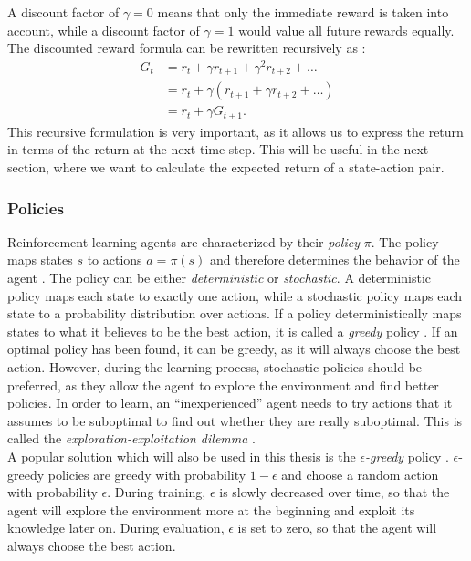 A discount factor of $\gamma=0$ means that only the immediate reward is taken into account, while a discount factor of $\gamma=1$ would value all future rewards equally.
\\
The discounted reward formula can be rewritten recursively as \cite[55]{sutton_reinforcement_nodate}:
\begin{align}
    G_t &= r_t + \gamma r_{t+1} + \gamma^2 r_{t+2} + \dots \nonumber \\
    &= r_t + \gamma (r_{t+1} + \gamma r_{t+2} + \dots) \nonumber \\
    &= r_t + \gamma G_{t+1} \text{.}
    \label{eq:discounted-return-recursive}
\end{align}
This recursive formulation is very important, as it allows us to express the return in terms of the return at the next time step.
This will be useful in the next section, where we want to calculate the expected return of a state-action pair.\\


\subsubsection{Policies}
\label{subsubsec:policies}
Reinforcement learning agents are characterized by their \textit{policy} $\pi$.
The policy maps states $s$ to actions $a=\pi(s)$ and therefore determines the behavior of the agent \cite[ch. 3.5]{sutton_reinforcement_nodate}.
The policy can be either \textit{deterministic} or \textit{stochastic}.
A deterministic policy maps each state to exactly one action, while a stochastic policy maps each state to a probability distribution over actions.
If a policy deterministically maps states to what it believes to be the best action, it is called a \textit{greedy} policy \cite[64]{sutton_reinforcement_nodate}.
If an optimal policy has been found, it can be greedy, as it will always choose the best action.
However, during the learning process, stochastic policies should be preferred, as they allow the agent to explore the environment and find better policies.
In order to learn, an \enquote{inexperienced} agent needs to try actions that it assumes to be suboptimal to find out whether they are really suboptimal.
This is called the \textit{exploration-exploitation dilemma} \cite[3]{sutton_reinforcement_nodate}.\\
A popular solution which will also be used in this thesis is the \textit{$\epsilon$-greedy} policy \cite[100]{sutton_reinforcement_nodate}.
$\epsilon$-greedy policies are greedy with probability $1-\epsilon$ and choose a random action with probability $\epsilon$.
During training, $\epsilon$ is slowly decreased over time, so that the agent will explore the environment more at the beginning and exploit its knowledge later on.
During evaluation, $\epsilon$ is set to zero, so that the agent will always choose the best action.\\


